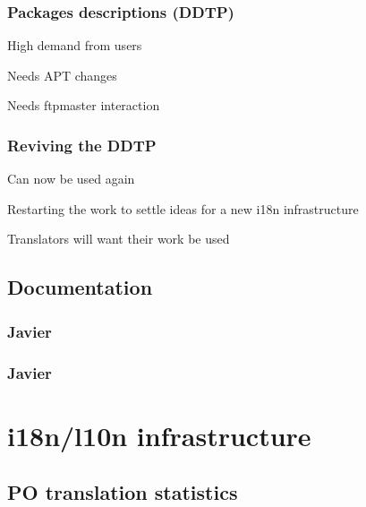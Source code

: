 \documentclass{beamer}
\begin{document}
\begin{frame}
  \frametitle{Packages descriptions (DDTP)}
	\begin{block}
		{High demand from users}
	\end{block}
	\begin{block}
		{Needs APT changes}
	\end{block}
	\begin{block}
		{Needs ftpmaster interaction}
	\end{block}
\end{frame}

\begin{frame}
  \frametitle{Reviving the DDTP}
	\begin{block}
		{Can now be used again}
	\end{block}
	\begin{block}
		{Restarting the work to settle ideas for a new i18n infrastructure}
	\end{block}
	\begin{block}
		{Translators will want their work be used}
	\end{block}
\end{frame}


\subsection{Documentation}

\begin{frame}
  \frametitle{Javier}
\end{frame}

\begin{frame}
  \frametitle{Javier}
\end{frame}


\section{i18n/l10n infrastructure}

\subsection{PO translation statistics}
\end{document}
